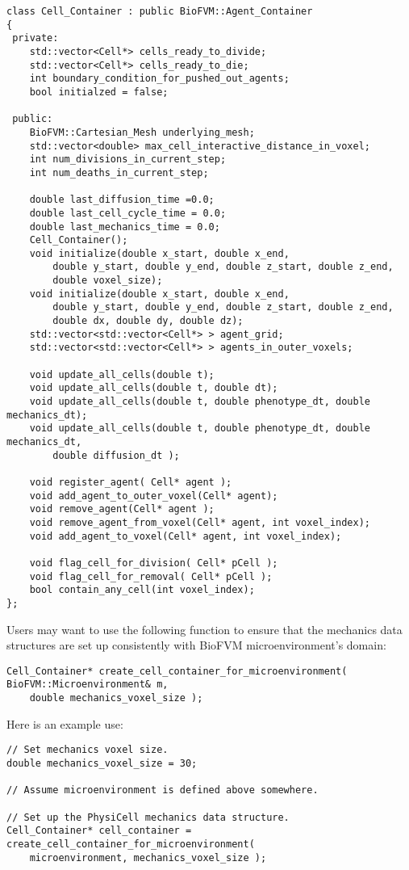 \documentclass[12pt]{article}
\begin{document}
\begin{verbatim}
class Cell_Container : public BioFVM::Agent_Container
{
 private:    
    std::vector<Cell*> cells_ready_to_divide; 
    std::vector<Cell*> cells_ready_to_die;
    int boundary_condition_for_pushed_out_agents;     
    bool initialzed = false;
    
 public:
    BioFVM::Cartesian_Mesh underlying_mesh;
    std::vector<double> max_cell_interactive_distance_in_voxel;
    int num_divisions_in_current_step;
    int num_deaths_in_current_step;

    double last_diffusion_time =0.0; 
    double last_cell_cycle_time = 0.0;
    double last_mechanics_time = 0.0;
    Cell_Container();
    void initialize(double x_start, double x_end, 
        double y_start, double y_end, double z_start, double z_end, 
        double voxel_size);
    void initialize(double x_start, double x_end, 
        double y_start, double y_end, double z_start, double z_end, 
        double dx, double dy, double dz);
    std::vector<std::vector<Cell*> > agent_grid;
    std::vector<std::vector<Cell*> > agents_in_outer_voxels;
    
    void update_all_cells(double t);
    void update_all_cells(double t, double dt);
    void update_all_cells(double t, double phenotype_dt, double mechanics_dt);
    void update_all_cells(double t, double phenotype_dt, double mechanics_dt,
        double diffusion_dt ); 

    void register_agent( Cell* agent );
    void add_agent_to_outer_voxel(Cell* agent);
    void remove_agent(Cell* agent );
    void remove_agent_from_voxel(Cell* agent, int voxel_index);
    void add_agent_to_voxel(Cell* agent, int voxel_index);
    
    void flag_cell_for_division( Cell* pCell ); 
    void flag_cell_for_removal( Cell* pCell ); 
    bool contain_any_cell(int voxel_index);
};
\end{verbatim}

Users may want to use the following function to ensure that the mechanics 
data structures are set up consistently with BioFVM microenvironment's 
domain:

\begin{verbatim}
Cell_Container* create_cell_container_for_microenvironment( BioFVM::Microenvironment& m, 
    double mechanics_voxel_size );
\end{verbatim}

Here is an example use: 
\begin{verbatim}
// Set mechanics voxel size. 
double mechanics_voxel_size = 30; 

// Assume microenvironment is defined above somewhere. 

// Set up the PhysiCell mechanics data structure. 
Cell_Container* cell_container = create_cell_container_for_microenvironment(
    microenvironment, mechanics_voxel_size );
\end{verbatim}
\end{document}

